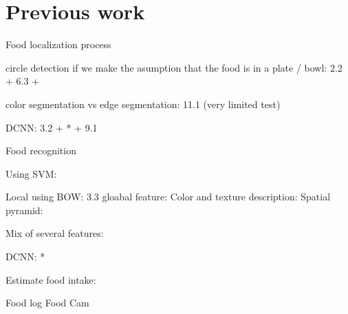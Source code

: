 \chapter{Previous work}

Food localization process

circle detection if we make the asumption that the food is in a plate / bowl: 2.2 + 6.3 + \cite{Dehais2015}

color segmentation vs edge segmentation: 11.1 (very limited test)

DCNN: 3.2 + * + 9.1

Food recognition

Using SVM:

Local using BOW: 3.3
gloabal feature:
Color and texture description: 
Spatial pyramid:

Mix of several features:

DCNN: *

Estimate food intake:

Food log
Food Cam